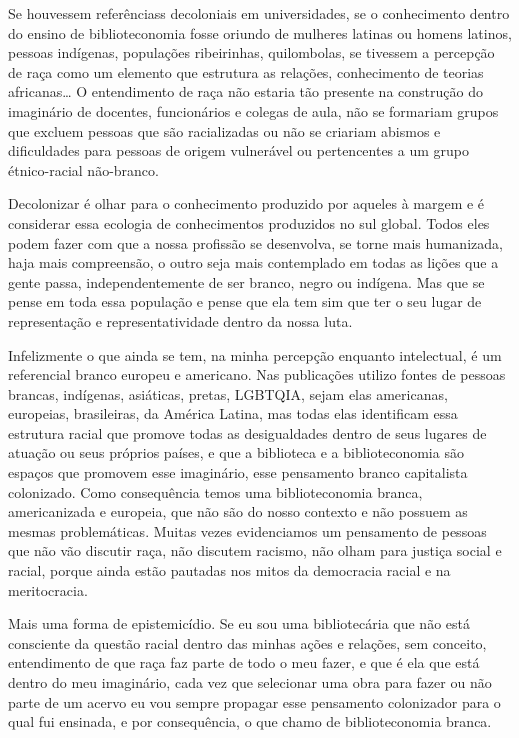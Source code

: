 \documentclass[a4paper,
fontsize=11pt,
oneside,
numbers=noperiodatend,
parskip=half-,
bibliography=totoc,
final
]{scrartcl}
\begin{document}
Se houvessem referênciass decoloniais em universidades, se o
conhecimento dentro do ensino de biblioteconomia fosse oriundo de
mulheres latinas ou homens latinos, pessoas indígenas, populações
ribeirinhas, quilombolas, se tivessem a percepção de raça como um
elemento que estrutura as relações, conhecimento de teorias
africanas\ldots{} O entendimento de raça não estaria tão presente na
construção do imaginário de docentes, funcionários e colegas de aula,
não se formariam grupos que excluem pessoas que são racializadas ou não
se criariam abismos e dificuldades para pessoas de origem vulnerável ou
pertencentes a um grupo étnico-racial não-branco.

Decolonizar é olhar para o conhecimento produzido por aqueles à margem e
é considerar essa ecologia de conhecimentos produzidos no sul global.
Todos eles podem fazer com que a nossa profissão se desenvolva, se torne
mais humanizada, haja mais compreensão, o outro seja mais contemplado em
todas as lições que a gente passa, independentemente de ser branco,
negro ou indígena. Mas que se pense em toda essa população e pense que
ela tem sim que ter o seu lugar de representação e representatividade
dentro da nossa luta.

Infelizmente o que ainda se tem, na minha percepção enquanto
intelectual, é um referencial branco europeu e americano. Nas
publicações utilizo fontes de pessoas brancas, indígenas, asiáticas,
pretas, LGBTQIA, sejam elas americanas, europeias, brasileiras, da
América Latina, mas todas elas identificam essa estrutura racial que
promove todas as desigualdades dentro de seus lugares de atuação ou seus
próprios países, e que a biblioteca e a biblioteconomia são espaços que
promovem esse imaginário, esse pensamento branco capitalista colonizado.
Como consequência temos uma biblioteconomia branca, americanizada e
europeia, que não são do nosso contexto e não possuem as mesmas
problemáticas. Muitas vezes evidenciamos um pensamento de pessoas que
não vão discutir raça, não discutem racismo, não olham para justiça
social e racial, porque ainda estão pautadas nos mitos da democracia
racial e na meritocracia.

Mais uma forma de epistemicídio. Se eu sou uma bibliotecária que não
está consciente da questão racial dentro das minhas ações e relações,
sem conceito, entendimento de que raça faz parte de todo o meu fazer, e
que é ela que está dentro do meu imaginário, cada vez que selecionar uma
obra para fazer ou não parte de um acervo eu vou sempre propagar esse
pensamento colonizador para o qual fui ensinada, e por consequência, o
que chamo de biblioteconomia branca.
\end{document}
